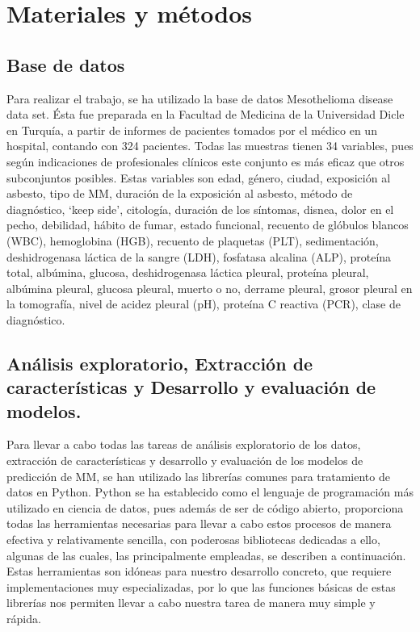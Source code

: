 \documentclass{article}
\begin{document}
\newpage
\section{Materiales y métodos}
\subsection{Base de datos}

Para realizar el trabajo, se ha utilizado la base de datos
Mesothelioma disease data set. Ésta fue preparada en la Facultad de
Medicina de la Universidad Dicle en Turquía, a partir de informes de
pacientes tomados por el médico en un hospital, contando con 324
pacientes. Todas las muestras tienen 34 variables, pues según
indicaciones de profesionales clínicos este conjunto es más eficaz que
otros subconjuntos posibles. Estas variables son edad, género, ciudad,
exposición al asbesto, tipo de MM, duración de la exposición al
asbesto, método de diagnóstico, ‘keep side’, citología, duración de
los síntomas, disnea, dolor en el pecho, debilidad, hábito de fumar,
estado funcional, recuento de glóbulos blancos (WBC), hemoglobina
(HGB), recuento de plaquetas (PLT), sedimentación, deshidrogenasa
láctica de la sangre (LDH), fosfatasa alcalina (ALP), proteína total,
albúmina, glucosa, deshidrogenasa láctica pleural, proteína pleural,
albúmina pleural, glucosa pleural, muerto o no, derrame pleural,
grosor pleural en la tomografía, nivel de acidez pleural (pH),
proteína C reactiva (PCR), clase de diagnóstico.


\subsection{Análisis exploratorio, Extracción de características y Desarrollo y evaluación de modelos.}

Para llevar a cabo todas las tareas de análisis exploratorio de los
datos, extracción de características y desarrollo y evaluación de los
modelos de predicción de MM, se han utilizado las librerías comunes
para tratamiento de datos en Python. Python se ha establecido como el
lenguaje de programación más utilizado en ciencia de datos, pues
además de ser de código abierto, proporciona todas las herramientas
necesarias para llevar a cabo estos procesos de manera efectiva y
relativamente sencilla, con poderosas bibliotecas dedicadas a ello,
algunas de las cuales, las principalmente empleadas, se describen a
continuación. Estas herramientas son idóneas para nuestro desarrollo
concreto, que requiere implementaciones muy especializadas, por lo que
las funciones básicas de estas librerías nos permiten llevar a cabo
nuestra tarea de manera muy simple y rápida.
\end{document}
